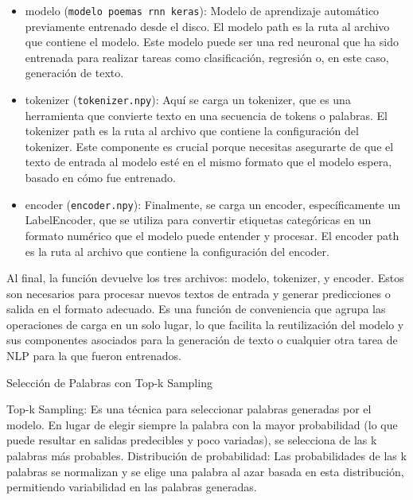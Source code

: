 \begin{itemize}
    \item modelo (\texttt{modelo poemas rnn keras}): Modelo de aprendizaje automático previamente entrenado desde el disco. 
    El modelo path es la ruta al archivo que contiene el modelo. Este modelo puede ser una 
    red neuronal que ha sido entrenada para realizar tareas como clasificación, 
    regresión o, en este caso, generación de texto.

    \item tokenizer (\texttt{tokenizer.npy}): Aquí se carga un tokenizer, que es 
    una herramienta que convierte texto en una secuencia de tokens o palabras. El tokenizer path 
    es la ruta al archivo que contiene la configuración del tokenizer. Este componente es 
    crucial porque necesitas asegurarte de que el texto de entrada al modelo esté en el mismo 
    formato que el modelo espera, basado en cómo fue entrenado.

    \item encoder (\texttt{encoder.npy}): Finalmente, se carga un encoder, específicamente 
    un LabelEncoder, que se utiliza para convertir etiquetas categóricas en un formato 
    numérico que el modelo puede entender y procesar. El encoder path es la ruta al archivo 
    que contiene la  configuración del encoder.
\end{itemize}

Al final, la función devuelve los tres archivos: modelo, tokenizer, y encoder. 
Estos son necesarios para procesar nuevos textos de entrada y generar predicciones o salida en 
el formato adecuado. Es una función de conveniencia que agrupa las operaciones de carga en un 
solo lugar, lo que facilita la reutilización del modelo y sus componentes asociados para la 
generación de texto o cualquier otra tarea de NLP para la que fueron entrenados.

\begin{center}
    Selección de Palabras con Top-k Sampling
\end{center}

Top-k Sampling: Es una técnica para seleccionar palabras generadas por el modelo. En lugar de elegir siempre la palabra con la mayor probabilidad (lo que puede resultar en salidas predecibles y poco variadas), se selecciona de las k palabras más probables.
Distribución de probabilidad: Las probabilidades de las k palabras se normalizan y se elige una palabra al azar basada en esta distribución, permitiendo variabilidad en las palabras generadas.


